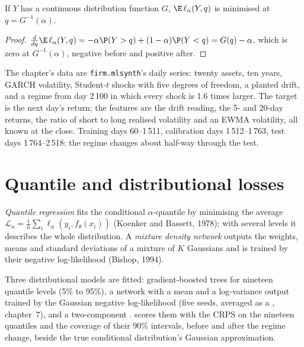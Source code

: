 \begin{proposition}\label{prop:ml:uncert:pinball}
If $Y$ has a continuous distribution function $G$, $\E\,\ell_\alpha(Y, q)$ is minimised at $q = G^{-1}(\alpha)$.
\end{proposition}

\begin{proof}
$\frac{d}{dq}\E\,\ell_\alpha(Y, q) = -\alpha\P(Y > q) + (1 - \alpha)\P(Y < q) = G(q) - \alpha$, which is zero at
$G^{-1}(\alpha)$, negative before and positive after.
\end{proof}

The chapter's data are \texttt{firm.mlsynth}'s daily series: twenty assets, ten years, GARCH volatility, Student-$t$
shocks with five degrees of freedom, a planted drift, and a regime from day 2\,100 in which every shock is 1.6 times
larger. The target is the next day's return; the features are the drift reading, the 5- and 20-day returns, the ratio of
short to long realised volatility and an EWMA volatility, all known at the close. Training days 60--1\,511, calibration
days 1\,512--1\,763, test days 1\,764--2\,518: the regime changes about half-way through the test.

\section{Quantile and distributional losses}

\begin{definition}\label{def:ml:probabilistic-models-and-uncertainty:quantile}
\emph{Quantile regression} fits the conditional $\alpha$-quantile by minimising the average
 $\mathcal L_n = \frac1n\sum_i\ell_\alpha(y_i, f_\theta(x_i))$ (Koenker and Bassett, 1978); with several
levels it describes the whole distribution. A \emph{mixture density network} outputs the
weights, means and standard deviations of a mixture of $K$ Gaussians and is trained by their negative log-likelihood
(Bishop, 1994).
\end{definition}

Three distributional models are fitted: gradient-boosted trees for nineteen quantile levels (5\% to 95\%), a network with a
mean and a log-variance output trained by the Gaussian negative log-likelihood (five seeds, averaged as a ,
chapter~7), and a two-component .  scores them with the CRPS on the
nineteen quantiles and the coverage of their 90\% intervals, before and after the regime change, beside the true
conditional distribution's Gaussian approximation.

